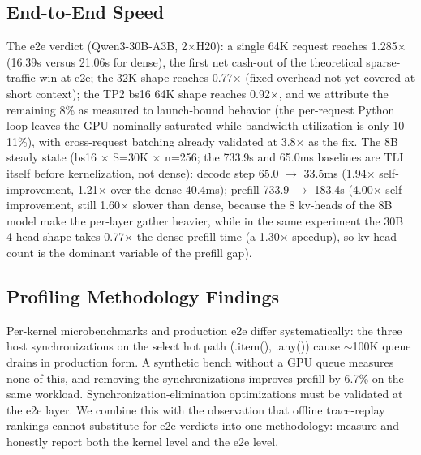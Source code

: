 \documentclass[11pt]{article}
\begin{document}
\subsection{End-to-End Speed}

The e2e verdict (Qwen3-30B-A3B, 2$\times$H20): a single 64K request reaches 1.285$\times$ (16.39s versus 21.06s for dense), the first net cash-out of the theoretical sparse-traffic win at e2e; the 32K shape reaches 0.77$\times$ (fixed overhead not yet covered at short context); the TP2 bs16 64K shape reaches 0.92$\times$, and we attribute the remaining 8\% as measured to launch-bound behavior (the per-request Python loop leaves the GPU nominally saturated while bandwidth utilization is only 10--11\%), with cross-request batching already validated at 3.8$\times$ as the fix. The 8B steady state (bs16 $\times$ S=30K $\times$ n=256; the 733.9s and 65.0ms baselines are TLI itself before kernelization, not dense): decode step 65.0 $\rightarrow$ 33.5ms (1.94$\times$ self-improvement, 1.21$\times$ over the dense 40.4ms); prefill 733.9 $\rightarrow$ 183.4s (4.00$\times$ self-improvement, still 1.60$\times$ slower than dense, because the 8 kv-heads of the 8B model make the per-layer gather heavier, while in the same experiment the 30B 4-head shape takes 0.77$\times$ the dense prefill time (a 1.30$\times$ speedup), so kv-head count is the dominant variable of the prefill gap).

\subsection{Profiling Methodology Findings}

Per-kernel microbenchmarks and production e2e differ systematically: the three host synchronizations on the select hot path (.item(), .any()) cause $\sim$100K queue drains in production form. A synthetic bench without a GPU queue measures none of this, and removing the synchronizations improves prefill by 6.7\% on the same workload. Synchronization-elimination optimizations must be validated at the e2e layer. We combine this with the observation that offline trace-replay rankings cannot substitute for e2e verdicts into one methodology: measure and honestly report both the kernel level and the e2e level.

\end{document}
